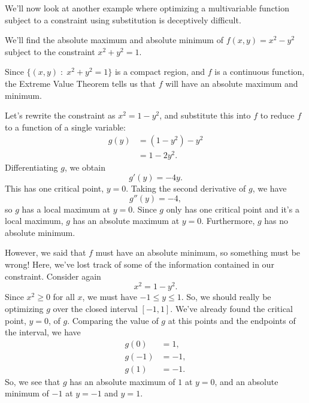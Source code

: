 \documentclass{ximera}
\begin{document}
We'll now look at another example where optimizing a multivariable function subject to a constraint using substitution is deceptively difficult.

\begin{example}
We'll find the absolute maximum and absolute minimum of $f(x,y) = x^2-y^2$ subject to the constraint $x^2+y^2=1$.

\begin{image}
\end{image}

Since $\{(x,y)\;:\;x^2+y^2=1\}$ is a compact region, and $f$ is a continuous function, the Extreme Value Theorem tells us that $f$ will have an absolute maximum and minimum.

Let's rewrite the constraint as $x^2=1-y^2$, and substitute this into $f$ to reduce $f$ to a function of a single variable:
\begin{align*}
g(y) &= (1-y^2)-y^2\\
&= 1-2y^2.
\end{align*}
Differentiating $g$, we obtain
\[
g'(y) = -4y.
\]
This has one critical point, $y=0$. Taking the second derivative of $g$, we have
\[
g''(y) = -4,
\] 
so $g$ has a local maximum at $y=0$. Since $g$ only has one critical point and it's a local maximum, $g$ has an absolute maximum at $y=0$. Furthermore, $g$ has no absolute minimum.

However, we said that $f$ must have an absolute minimum, so something must be wrong! Here, we've lost track of some of the information contained in our constraint. Consider again
\[
x^2= 1-y^2.
\]
Since $x^2\geq 0$ for all $x$, we must have $-1\leq y\leq 1$. So, we should really be optimizing $g$ over the closed interval $[-1,1]$. We've already found the critical point, $y=0$, of $g$. Comparing the value of $g$ at this points and the endpoints of the interval, we have
\begin{align*}
g(0) &= 1,\\
g(-1) &=-1,\\
g(1) &= -1.
\end{align*}
So, we see that $g$ has an absolute maximum of $1$ at $y=0$, and an absolute minimum of $-1$ at $y=-1$ and $y=1$.


\end{example}
\end{document}
